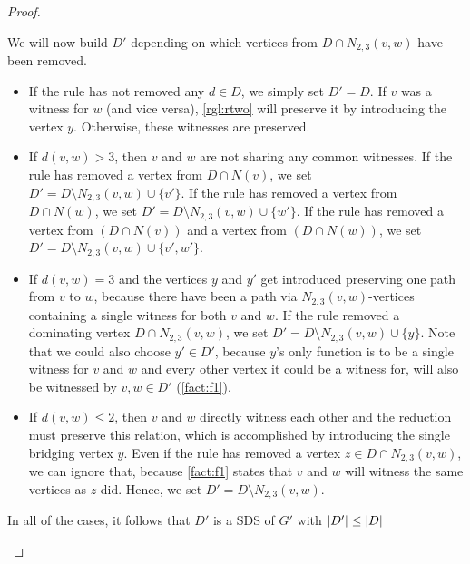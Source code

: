 \begin{proof}
\begin{enumerate}
\begin{enumerate}
            We will now build $D'$ depending on which vertices from $D \cap N_{2,3}(v,w)$ have been removed. 
            \begin{itemize}
                \item If the rule has not removed any $d \in D$, we simply set $D' = D$. If $v$ was a witness for $w$ (and vice versa), \cref{rgl:rtwo} will preserve it by introducing the vertex $y$. Otherwise, these witnesses are preserved.
                \item If $d(v,w) > 3$, then $v$ and $w$ are not sharing any common witnesses. 
                If the rule has removed a vertex from $D \cap N(v)$, we set $D' = D \setminus N_{2,3}(v,w) \cup \{v'\}$.
                If the rule has removed a vertex from $D \cap N(w)$, we  set $D' = D \setminus N_{2,3}(v,w) \cup \{w'\}$.
                If the rule has removed a vertex from $(D \cap N(v))$ and a vertex from $(D \cap N(w))$, we set $D' = D \setminus N_{2,3}(v,w) \cup \{v', w'\}$.
                \item If $d(v,w) = 3$ and the vertices $y$ and $y'$ get introduced preserving one path from $v$ to $w$, because there have been a path via $N_{2,3}(v,w)$-vertices containing a single witness for both $v$ and $w$.
                If the rule removed a dominating vertex $D \cap N_{2,3}(v, w)$, we set $D' = D \setminus N_{2,3}(v,w) \cup \{y\}$. Note that we could also choose $y' \in D'$, because $y$'s only function is to be a single witness for $v$ and $w$ and every other vertex it could be a witness for, will also be witnessed by $v,w \in D'$ (\cref{fact:f1}).
                \item If $d(v,w) \leq 2$, then $v$ and $w$ directly witness each other and the reduction must preserve this relation, which is accomplished by introducing the single bridging vertex $y$. 
                Even if the rule has removed a vertex $z \in D \cap N_{2,3}(v,w)$, we can ignore that, because \cref{fact:f1} states that $v$ and $w$ will witness the same vertices as $z$ did. Hence, we set $D' = D \setminus N_{2,3}(v,w)$.
            \end{itemize}
            
            In all of the cases, it follows that $D'$ is a SDS of $G'$ with $\abs{D'} \leq \abs{D}$ 
            

\end{enumerate}
\end{enumerate}
\end{proof}
